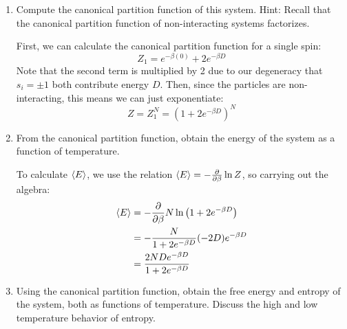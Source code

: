 \documentclass[10pt]{article}
\begin{document}
	\begin{enumerate}[label=\alph*)]
		\item Compute the canonical partition function of this system. Hint: Recall that the canonical partition
			function of non-interacting systems factorizes.

			\begin{solution}
				First, we can calculate the canonical partition function for a single spin: 
				\[
					Z_1 = e^{-\beta(0)} + 2e^{-\beta D}
				\] 
				Note that the second term is multiplied by 2 due to our degeneracy that \(s_i = \pm 1\) both 
				contribute energy \(D\). Then, since the particles are non-interacting, this means 
				we can just exponentiate:
				\[
				Z = Z_1^{N} = (1 + 2e^{-\beta D})^{N}
				\] 
			\end{solution}
		\item From the canonical partition function, obtain the energy of the system as a function of 
			temperature. 

			\begin{solution}
				To calculate \(\langle E \rangle\), we use the relation \(\langle E \rangle = -\pdv{\beta} \ln Z\), so carrying 
				out the algebra:
				\begin{align*}
					\langle E \rangle &= -\pdv{\beta} N \ln \left( 1 + 2e^{-\beta D} \right) \\
					&= -\frac{N}{1 + 2e^{-\beta D}} (-2D)e^{-\beta D} \\
					&= \frac{2ND e^{-\beta D}}{1 + 2e^{-\beta D}} 
				\end{align*}
			\end{solution}
		\item Using the canonical partition function, obtain the free energy and entropy of the system, both 
			as functions of temperature. Discuss the high and low temperature 
			behavior of entropy. 


\end{enumerate}
\end{document}
